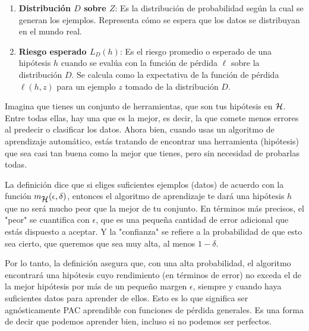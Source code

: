 \begin{enumerate}[1.]
    \item \textbf{Distribución \boldmath$ D $ sobre $ Z $}: Es la distribución de probabilidad según la cual se generan los ejemplos. Representa cómo se espera que los datos se distribuyan en el mundo real.

    \item \textbf{Riesgo esperado \boldmath$ L_D(h)$}: Es el riesgo promedio o esperado de una hipótesis $ h $ cuando se evalúa con la función de pérdida $ \ell $ sobre la distribución $ D $. Se calcula como la expectativa de la función de pérdida $ \ell(h, z) $ para un ejemplo $ z $ tomado de la distribución $ D $.
\end{enumerate}


Imagina que tienes un conjunto de herramientas, que son tus hipótesis en $ \mathop{\mbox{$\mathcal{H}$}}\nolimits $. Entre todas ellas, hay una que es la mejor, es decir, la que comete menos errores al predecir o clasificar los datos. Ahora bien, cuando usas un algoritmo de aprendizaje automático, estás tratando de encontrar una herramienta (hipótesis) que sea casi tan buena como la mejor que tienes, pero sin necesidad de probarlas todas.

La definición dice que si eliges suficientes ejemplos (datos) de acuerdo con la función $ m_{\mathop{\mbox{$\mathcal{H}$}}\nolimits}(\epsilon, \delta) $, entonces el algoritmo de aprendizaje te dará una hipótesis $ h $ que no será mucho peor que la mejor de tu conjunto. En términos más precisos, el "peor" se cuantifica con $ \epsilon $, que es una pequeña cantidad de error adicional que estás dispuesto a aceptar. Y la "confianza" se refiere a la probabilidad de que esto sea cierto, que queremos que sea muy alta, al menos $ 1 - \delta $.

Por lo tanto, la definición asegura que, con una alta probabilidad, el algoritmo encontrará una hipótesis cuyo rendimiento (en términos de error) no exceda el de la mejor hipótesis por más de un pequeño margen $ \epsilon $, siempre y cuando haya suficientes datos para aprender de ellos. Esto es lo que significa ser agnósticamente PAC aprendible con funciones de pérdida generales. Es una forma de decir que podemos aprender bien, incluso si no podemos ser perfectos.

